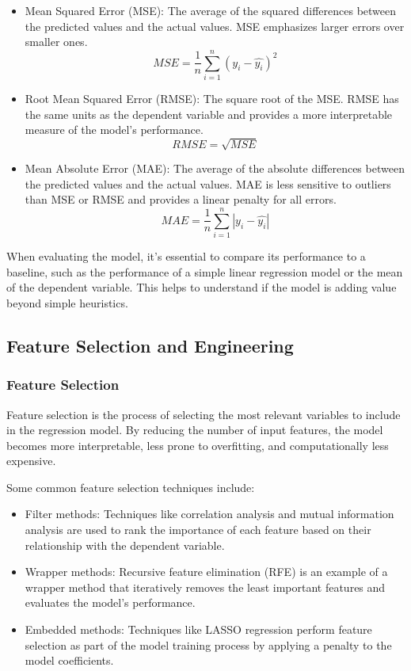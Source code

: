\documentclass{article}
\begin{document}
\begin{itemize}
\item Mean Squared Error (MSE): The average of the squared differences between the predicted values and the actual values. MSE emphasizes larger errors over smaller ones.
\begin{equation}
MSE = \frac{1}{n}\sum_{i=1}^{n}(y_i - \hat{y_i})^2
\end{equation}

\item Root Mean Squared Error (RMSE): The square root of the MSE. RMSE has the same units as the dependent variable and provides a more interpretable measure of the model's performance.
\begin{equation}
RMSE = \sqrt{MSE}
\end{equation}

\item Mean Absolute Error (MAE): The average of the absolute differences between the predicted values and the actual values. MAE is less sensitive to outliers than MSE or RMSE and provides a linear penalty for all errors.
\begin{equation}
MAE = \frac{1}{n}\sum_{i=1}^{n}|y_i - \hat{y_i}|
\end{equation}
\end{itemize}

When evaluating the model, it's essential to compare its performance to a baseline, such as the performance of a simple linear regression model or the mean of the dependent variable. This helps to understand if the model is adding value beyond simple heuristics.

\subsection{Feature Selection and Engineering}

\subsubsection{Feature Selection}
Feature selection is the process of selecting the most relevant variables to include in the regression model. By reducing the number of input features, the model becomes more interpretable, less prone to overfitting, and computationally less expensive.

Some common feature selection techniques include:

\begin{itemize}
\item Filter methods: Techniques like correlation analysis and mutual information analysis are used to rank the importance of each feature based on their relationship with the dependent variable.
\item Wrapper methods: Recursive feature elimination (RFE) is an example of a wrapper method that iteratively removes the least important features and evaluates the model's performance.
\item Embedded methods: Techniques like LASSO regression perform feature selection as part of the model training process by applying a penalty to the model coefficients.
\end{itemize}
\end{document}
